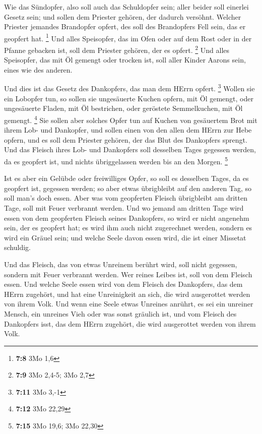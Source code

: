  Wie das Sündopfer, also soll auch das Schuldopfer sein;
aller beider soll einerlei Gesetz sein; und sollen dem Priester gehören,
der dadurch versöhnt.  Welcher Priester jemandes Brandopfer
opfert, des soll des Brandopfers Fell sein, das er geopfert hat.
\footnote{\textbf{7:8} 3Mo 1,6}  Und alles Speisopfer, das
im Ofen oder auf dem Rost oder in der Pfanne gebacken ist, soll dem
Priester gehören, der es opfert. \footnote{\textbf{7:9} 3Mo 2,4-5; 3Mo
  2,7}  Und alles Speisopfer, das mit Öl gemengt oder
trocken ist, soll aller Kinder Aarons sein, eines wie des anderen.

 Und dies ist das Gesetz des Dankopfers, das man dem HErrn
opfert. \footnote{\textbf{7:11} 3Mo 3,-1}  Wollen sie ein
Lobopfer tun, so sollen sie ungesäuerte Kuchen opfern, mit Öl gemengt,
oder ungesäuerte Fladen, mit Öl bestrichen, oder geröstete Semmelkuchen,
mit Öl gemengt. \footnote{\textbf{7:12} 3Mo 22,29}  Sie
sollen aber solches Opfer tun auf Kuchen von gesäuertem Brot mit ihrem
Lob- und Dankopfer,  und sollen einen von den allen dem
HErrn zur Hebe opfern, und es soll dem Priester gehören, der das Blut
des Dankopfers sprengt.  Und das Fleisch ihres Lob- und
Dankopfers soll desselben Tages gegessen werden, da es geopfert ist, und
nichts übriggelassen werden bis an den Morgen. \footnote{\textbf{7:15}
  3Mo 19,6; 3Mo 22,30}

 Ist es aber ein Gelübde oder freiwilliges Opfer, so soll
es desselben Tages, da es geopfert ist, gegessen werden; so aber etwas
übrigbleibt auf den anderen Tag, so soll man's doch essen. 
Aber was vom geopferten Fleisch übrigbleibt am dritten Tage, soll mit
Feuer verbrannt werden.  Und wo jemand am dritten Tage wird
essen von dem geopferten Fleisch seines Dankopfers, so wird er nicht
angenehm sein, der es geopfert hat; es wird ihm auch nicht zugerechnet
werden, sondern es wird ein Gräuel sein; und welche Seele davon essen
wird, die ist einer Missetat schuldig.

 Und das Fleisch, das von etwas Unreinem berührt wird, soll
nicht gegessen, sondern mit Feuer verbrannt werden. Wer reines Leibes
ist, soll von dem Fleisch essen.  Und welche Seele essen
wird von dem Fleisch des Dankopfers, das dem HErrn zugehört, und hat
eine Unreinigkeit an sich, die wird ausgerottet werden von ihrem Volk.
 Und wenn eine Seele etwas Unreines anrührt, es sei ein
unreiner Mensch, ein unreines Vieh oder was sonst gräulich ist, und vom
Fleisch des Dankopfers isst, das dem HErrn zugehört, die wird
ausgerottet werden von ihrem Volk.

